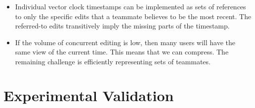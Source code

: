 \documentclass[runningheads]{llncs}
\begin{document}
\begin{itemize}
  \item Individual vector clock timestamps can be implemented as sets of references to only the specific edits that a teammate believes to be the most recent.
    The referred-to edits transitively imply the missing parts of the timestamp.
  \item If the volume of concurrent editing is low, then many users will have the same view of the current time.
    This means that we can compress.
    The remaining challenge is efficiently representing sets of teammates.
\end{itemize}

\section{Experimental Validation}

\section{}

\end{document}
